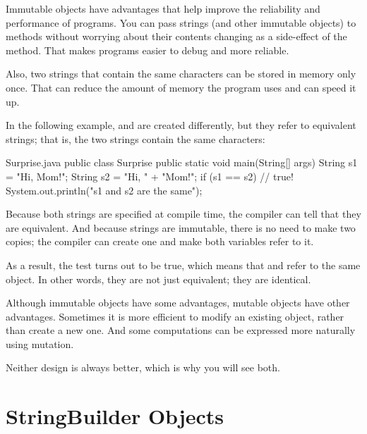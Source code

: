 Immutable objects have advantages that help improve the reliability and performance of programs.
You can pass strings (and other immutable objects) to methods without worrying about their contents changing as a side-effect of the method.
That makes programs easier to debug and more reliable.

Also, two strings that contain the same characters can be stored in memory only once.
That can reduce the amount of memory the program uses and can speed it up.


In the following example,  and  are created differently, but they refer to equivalent strings; that is, the two strings contain the same characters:


\begin{trinket}[265]{Surprise.java}
public class Surprise {
    public static void main(String[] args) {
        String s1 = "Hi, Mom!";
        String s2 = "Hi, " + "Mom!";
        if (s1 == s2) {                // true!
            System.out.println("s1 and s2 are the same");
        }
    }
}
\end{trinket}

Because both strings are specified at compile time, the compiler can tell that they are equivalent.
And because strings are immutable, there is no need to make two copies; the compiler can create one  and make both variables refer to it.

As a result, the test  turns out to be true, which means that  and  refer to the same object.
In other words, they are not just equivalent; they are identical.


Although immutable objects have some advantages, mutable objects have other advantages.
Sometimes it is more efficient to modify an existing object, rather than create a new one.
And some computations can be expressed more naturally using mutation.

Neither design is always better, which is why you will see both.


\section{StringBuilder Objects}
\label{mutable-objects_stringbuilder-objects}
\label{stringbuilder}

